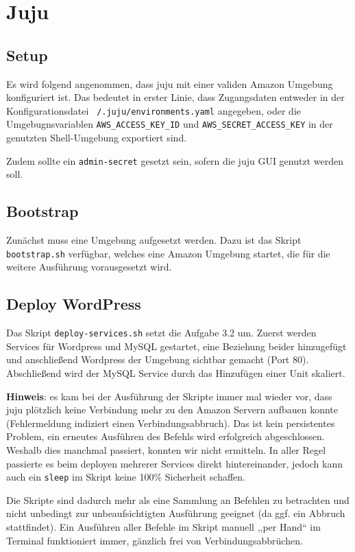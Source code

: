 \section{Juju}
\subsection{Setup}

Es wird folgend angenommen, dass juju mit einer validen Amazon Umgebung konfiguriert ist.
Das bedeutet in erster Linie, dass Zugangsdaten entweder in der Konfigurationsdatei \texttt{~/.juju/environments.yaml} angegeben, oder die Umgebugnsvariablen \texttt{AWS\_ACCESS\_KEY\_ID} und \texttt{AWS\_SECRET\_ACCESS\_KEY} in der genutzten Shell-Umgebung exportiert sind.

Zudem sollte ein \texttt{admin-secret} gesetzt sein, sofern die juju GUI genutzt werden soll.


\subsection{Bootstrap}

Zunächst muss eine Umgebung aufgesetzt werden.
Dazu ist das Skript \texttt{bootstrap.sh} verfügbar, welches eine Amazon Umgebung startet, die für die weitere Ausführung vorausgesetzt wird.


\subsection{Deploy WordPress}

Das Skript \texttt{deploy-services.sh} setzt die Aufgabe 3.2 um.
Zuerst werden Services für Wordpress und MySQL gestartet, eine Beziehung beider hinzugefügt und anschließend Wordpress der Umgebung sichtbar gemacht (Port 80).
Abschließend wird der MySQL Service durch das Hinzufügen einer Unit skaliert.

\textbf{Hinweis}: es kam bei der Ausführung der Skripte immer mal wieder vor, dass juju plötzlich keine Verbindung mehr zu den Amazon Servern aufbauen konnte (Fehlermeldung indiziert einen Verbindungsabbruch).
Das ist kein persistentes Problem, ein erneutes Ausführen des Befehls wird erfolgreich abgeschlossen.
Weshalb dies manchmal passiert, konnten wir nicht ermitteln.
In aller Regel passierte es beim deployen mehrerer Services direkt hintereinander, jedoch kann auch ein \texttt{sleep} im Skript keine 100\% Sicherheit schaffen.

Die Skripte sind dadurch mehr als eine Sammlung an Befehlen zu betrachten und nicht unbedingt zur unbeaufsichtigten Ausführung geeignet (da ggf. ein Abbruch stattfindet).
Ein Ausführen aller Befehle im Skript manuell ,,per Hand`` im Terminal funktioniert immer, gänzlich frei von Verbindungsabbrüchen.


